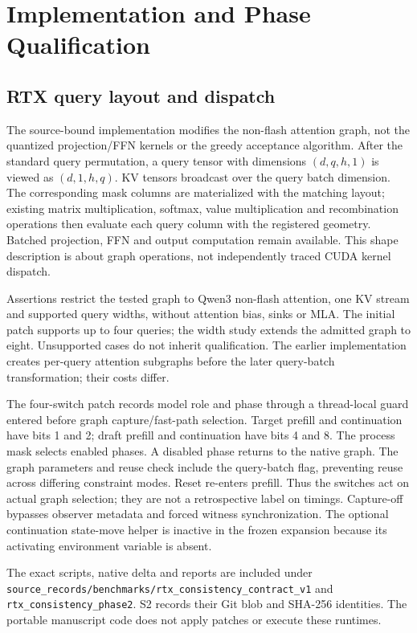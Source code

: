\section{Implementation and Phase Qualification}
\label{supp:implementation}
\subsection{RTX query layout and dispatch}
The source-bound implementation modifies the non-flash attention graph, not the quantized projection/FFN kernels or the greedy acceptance algorithm. After the standard query permutation, a query tensor with dimensions $(d,q,h,1)$ is viewed as $(d,1,h,q)$. KV tensors broadcast over the query batch dimension. The corresponding mask columns are materialized with the matching layout; existing matrix multiplication, softmax, value multiplication and recombination operations then evaluate each query column with the registered geometry. Batched projection, FFN and output computation remain available. This shape description is about graph operations, not independently traced CUDA kernel dispatch.

Assertions restrict the tested graph to Qwen3 non-flash attention, one KV stream and supported query widths, without attention bias, sinks or MLA. The initial patch supports up to four queries; the width study extends the admitted graph to eight. Unsupported cases do not inherit qualification. The earlier implementation creates per-query attention subgraphs before the later query-batch transformation; their costs differ.

The four-switch patch records model role and phase through a thread-local guard entered before graph capture/fast-path selection. Target prefill and continuation have bits 1 and 2; draft prefill and continuation have bits 4 and 8. The process mask selects enabled phases. A disabled phase returns to the native graph. The graph parameters and reuse check include the query-batch flag, preventing reuse across differing constraint modes. Reset re-enters prefill. Thus the switches act on actual graph selection; they are not a retrospective label on timings. Capture-off bypasses observer metadata and forced witness synchronization. The optional continuation state-move helper is inactive in the frozen expansion because its activating environment variable is absent.

The exact scripts, native delta and reports are included under \nolinkurl{source_records/benchmarks/rtx_consistency_contract_v1} and \nolinkurl{rtx_consistency_phase2}. S2 records their Git blob and SHA-256 identities. The portable manuscript code does not apply patches or execute these runtimes.

